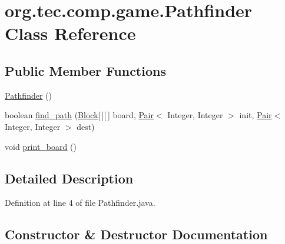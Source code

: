 \hypertarget{classorg_1_1tec_1_1comp_1_1game_1_1_pathfinder}{}\section{org.\+tec.\+comp.\+game.\+Pathfinder Class Reference}
\label{classorg_1_1tec_1_1comp_1_1game_1_1_pathfinder}
\subsection*{Public Member Functions}
\begin{DoxyCompactItemize}
\item 
\mbox{\hyperlink{classorg_1_1tec_1_1comp_1_1game_1_1_pathfinder_a224fab0fa449d9eab826b2eb297c3889}{Pathfinder}} ()
\item 
boolean \mbox{\hyperlink{classorg_1_1tec_1_1comp_1_1game_1_1_pathfinder_a617b30f7fe395815d26315171a5be003}{find\+\_\+path}} (\mbox{\hyperlink{classorg_1_1tec_1_1comp_1_1game_1_1_block}{Block}}\mbox{[}$\,$\mbox{]}\mbox{[}$\,$\mbox{]} board, \mbox{\hyperlink{classorg_1_1tec_1_1comp_1_1interpreter_1_1_pair}{Pair}}$<$ Integer, Integer $>$ init, \mbox{\hyperlink{classorg_1_1tec_1_1comp_1_1interpreter_1_1_pair}{Pair}}$<$ Integer, Integer $>$ dest)
\item 
void \mbox{\hyperlink{classorg_1_1tec_1_1comp_1_1game_1_1_pathfinder_a50a7f6d655a754a8a7e4e37726b5c1c9}{print\+\_\+board}} ()
\end{DoxyCompactItemize}


\subsection{Detailed Description}


Definition at line 4 of file Pathfinder.\+java.



\subsection{Constructor \& Destructor Documentation}
\mbox{\label{classorg_1_1tec_1_1comp_1_1game_1_1_pathfinder_a224fab0fa449d9eab826b2eb297c3889}} 
